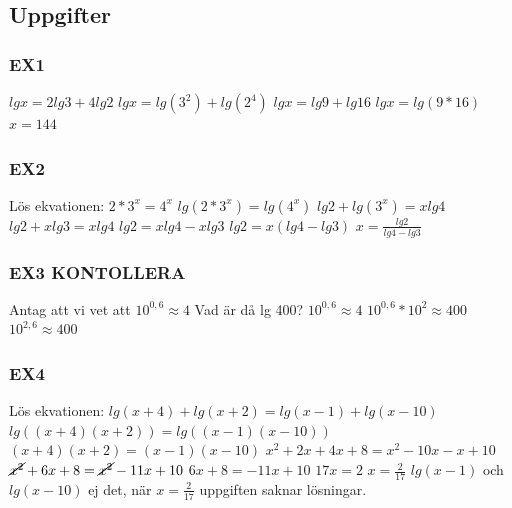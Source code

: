 \documentclass[a4paper,11pt]{article}
\begin{document}
\begin{flushleft}
\subsection{Uppgifter}
\subsubsection{EX1}
$ lgx = 2lg3+4lg2 $\newline
$ lgx = lg(3^2)+lg(2^4) $\newline
$ lgx = lg9+lg16 $\newline
$ lgx = lg(9*16) $\newline
$ x = 144 $
\subsubsection{EX2}
Lös ekvationen:\newline
$ 2*3^x=4^x $\newline
$ lg(2*3^x) = lg(4^x) $\newline
$ lg2+lg(3^x) = xlg4 $\newline
$ lg2+xlg3 = xlg4 $\newline
$ lg2 = xlg4-xlg3 $\newline
$ lg2 = x(lg4-lg3) $\newline
$ x = \frac{lg2}{lg4-lg3} $
\subsubsection{EX3 KONTOLLERA}
Antag att vi vet att $ 10^{0,6}\approx4 $\newline
Vad är då lg 400?\newline
$ 10^{0,6}\approx4 $\newline
$ 10^{0,6}*10^2\approx400 $\newline
$ 10^{2,6}\approx400 $\newline
\subsubsection{EX4}
Lös ekvationen:\newline
$ lg(x+4)+lg(x+2) = lg(x-1)+lg(x-10) $\newline
$ lg((x+4)(x+2)) = lg((x-1)(x-10)) $\newline
$ (x+4)(x+2) = (x-1)(x-10) $\newline
$ x^2+2x+4x+8 = x^2-10x-x+10 $\newline
$ \cancel{x^2}+6x+8 = \cancel{x^2}-11x+10 $\newline
$ 6x+8 = -11x+10 $\newline
$ 17x = 2 $\newline
$ x = \frac{2}{17} $\newline
$ lg(x-1) $ och $ lg(x-10) $ ej det, när $ x=\frac{2}{17} $ uppgiften saknar lösningar.

\end{flushleft}
\end{document}
